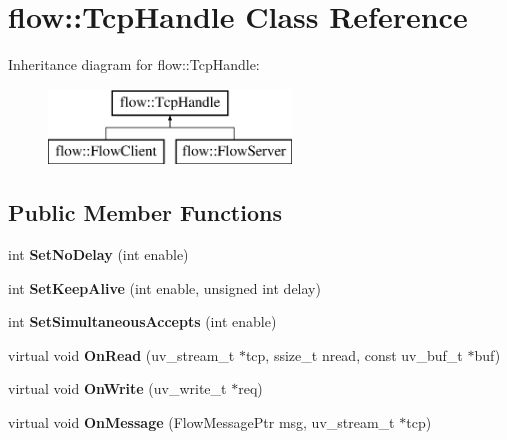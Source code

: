 \hypertarget{classflow_1_1_tcp_handle}{}\section{flow\+:\+:Tcp\+Handle Class Reference}
\label{classflow_1_1_tcp_handle}
Inheritance diagram for flow\+:\+:Tcp\+Handle\+:\begin{figure}[H]
\begin{center}
\leavevmode
\includegraphics[height=2.000000cm]{classflow_1_1_tcp_handle}
\end{center}
\end{figure}
\subsection*{Public Member Functions}
\begin{DoxyCompactItemize}
\item 
int {\bfseries Set\+No\+Delay} (int enable)\hypertarget{classflow_1_1_tcp_handle_aeecda777ffdc732455658e37045b2756}{}\label{classflow_1_1_tcp_handle_aeecda777ffdc732455658e37045b2756}

\item 
int {\bfseries Set\+Keep\+Alive} (int enable, unsigned int delay)\hypertarget{classflow_1_1_tcp_handle_a87f92b9050d429cb34176069c39cf152}{}\label{classflow_1_1_tcp_handle_a87f92b9050d429cb34176069c39cf152}

\item 
int {\bfseries Set\+Simultaneous\+Accepts} (int enable)\hypertarget{classflow_1_1_tcp_handle_a6d1108eae7146defb6bb9ce2589c908a}{}\label{classflow_1_1_tcp_handle_a6d1108eae7146defb6bb9ce2589c908a}

\item 
virtual void {\bfseries On\+Read} (uv\+\_\+stream\+\_\+t $\ast$tcp, ssize\+\_\+t nread, const uv\+\_\+buf\+\_\+t $\ast$buf)\hypertarget{classflow_1_1_tcp_handle_ac67a23fb5711a520aefd8dfca4b7a1b1}{}\label{classflow_1_1_tcp_handle_ac67a23fb5711a520aefd8dfca4b7a1b1}

\item 
virtual void {\bfseries On\+Write} (uv\+\_\+write\+\_\+t $\ast$req)\hypertarget{classflow_1_1_tcp_handle_ae36e5fe3cedd3ca1467134c6d8bba3bf}{}\label{classflow_1_1_tcp_handle_ae36e5fe3cedd3ca1467134c6d8bba3bf}

\item 
virtual void {\bfseries On\+Message} (Flow\+Message\+Ptr msg, uv\+\_\+stream\+\_\+t $\ast$tcp)\hypertarget{classflow_1_1_tcp_handle_a23c11f6820b8f36cd9ba646fc16aaf55}{}\label{classflow_1_1_tcp_handle_a23c11f6820b8f36cd9ba646fc16aaf55}

\end{DoxyCompactItemize}
